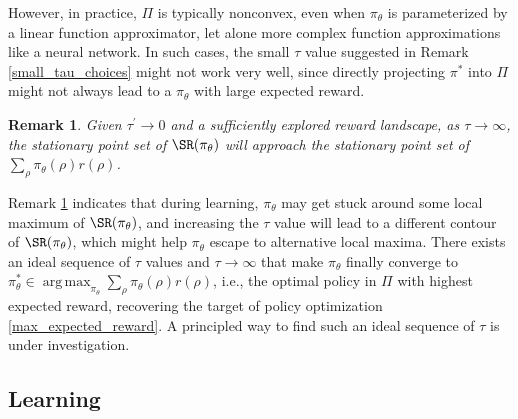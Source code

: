 \documentclass{article}
\newtheorem{remk}{Remark}
\DeclareMathOperator*{\argmax}{arg\,max}
\begin{document}
However, in practice, $\Pi$ is typically nonconvex, even when $\pi_\theta$ is parameterized by a linear function approximator, let alone more complex function approximations like a neural network. In such cases, the small $\tau$ value suggested in Remark \ref{small_tau_choices} might not work very well, since directly projecting $\pi^*$ into $\Pi$ might not always lead to a $\pi_\theta$ with large expected reward.

\begin{remk}
	\label{large_tau_choices}
	Given $\tau^{\prime} \to 0$ and a sufficiently explored reward landscape, as $\tau \to \infty$, the stationary point set of $\SR(\pi_\theta)$ will approach the stationary point set of $\sum_{\rho}{ \pi_\theta(\rho) r(\rho) }$.
\end{remk}

Remark \ref{large_tau_choices} indicates that during learning, $\pi_\theta$ may get stuck around some local maximum of $\SR(\pi_\theta)$, and increasing the $\tau$ value will lead to a different contour of $\SR(\pi_\theta)$, which might help $\pi_\theta$ escape to alternative local maxima. There exists an ideal sequence of $\tau$ values and $\tau \to \infty$ that make $\pi_\theta$ finally converge to $\pi_\theta^* \in \argmax_{\pi_\theta}{ \sum_{\rho}{\pi_\theta(\rho) r(\rho)} }$, i.e., the optimal policy in $\Pi$ with highest expected reward, recovering the target of policy optimization \cref{max_expected_reward}. A principled way to find such an ideal sequence of $\tau$ is under investigation.

\subsection{Learning}
\end{document}
